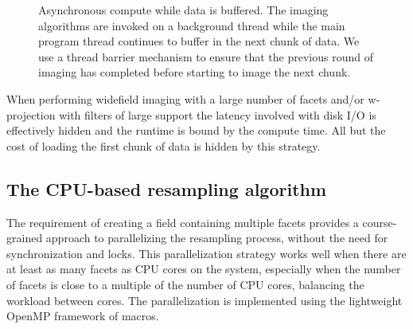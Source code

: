 \begin{figure}[ht!]
 \begin{mdframed}
 \centering
 \caption[Aynchronous compute]{Asynchronous compute while data is buffered. The imaging algorithms are invoked on a background thread while the main 
 program thread continues to buffer in the next chunk of data. We use a thread barrier mechanism to ensure that the previous round of imaging has completed before starting
 to image the next chunk.}
 \label{fig_async_compute}
 \end{mdframed}
\end{figure}

When performing widefield imaging with a large number of facets and/or w-projection with filters of large support the latency involved with disk
I/O is effectively hidden and the runtime is bound by the compute time. All but the cost of loading the first chunk of data is hidden by this strategy.

\subsection{The CPU-based resampling algorithm}
The requirement of creating a field containing multiple facets provides a course-grained approach to parallelizing the resampling process,
without the need for synchronization and locks. This parallelization strategy works well when there are at least as many facets as CPU cores 
on the system, especially when the number of facets is close to a multiple of the number of CPU cores, balancing the workload between cores. The
parallelization is implemented using the lightweight OpenMP framework of macros.

